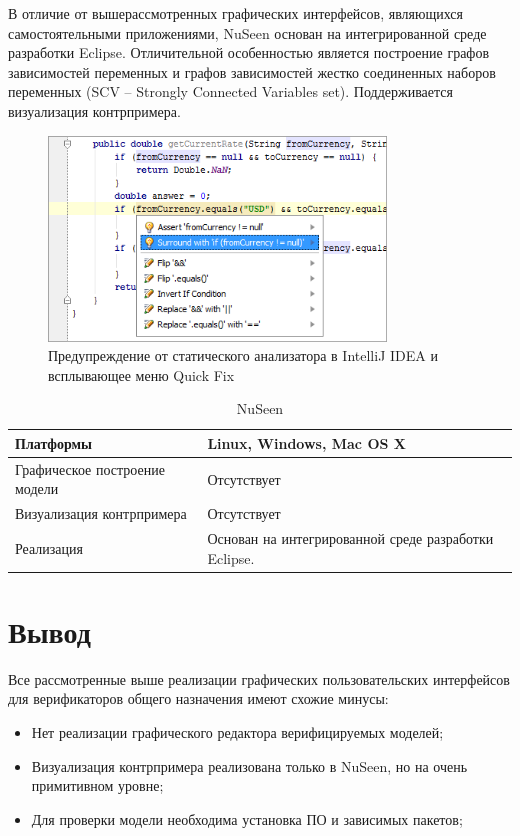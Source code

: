 В отличие от вышерассмотренных графических интерфейсов, являющихся самостоятельными приложениями, NuSeen основан на интегрированной среде разработки Eclipse. Отличительной особенностью является построение графов зависимостей переменных и графов зависимостей жестко соединенных наборов переменных (SCV – Strongly Connected Variables set). Поддерживается визуализация контрпримера.

\begin{figure}[htbp]
	\centering
	\includegraphics[width=0.8\textwidth]{fig/code_analysis_bugs.png}
	\caption{Предупреждение от статического анализатора в IntelliJ IDEA и всплывающее меню Quick Fix}%
	\label{fig:idea}
\end{figure}




\begin{table}[ht]
	\caption{NuSeen}\label{tab:nuseen}
	\centering
	\begin{tabular}{|m{2.5 cm}|m{7.5 cm}|}
		\hline
		Платформы & Linux, Windows, Mac OS X \\
		\hline
		Графическое построение модели & Отсутствует \\
		\hline
		Визуализация контрпримера & Отсутствует \\
		\hline
		Реализация & Основан на интегрированной среде разработки Eclipse.\\
		\hline
	\end{tabular}
\end{table}

\section{Вывод}

Все рассмотренные выше реализации графических пользовательских интерфейсов для верификаторов общего назначения имеют схожие минусы:
\begin{itemize}
	\item Нет реализации графического редактора верифицируемых моделей;
	\item Визуализация контрпримера реализована только в NuSeen, но на очень примитивном уровне;
	\item Для проверки модели необходима установка ПО и зависимых пакетов;
\end{itemize}

